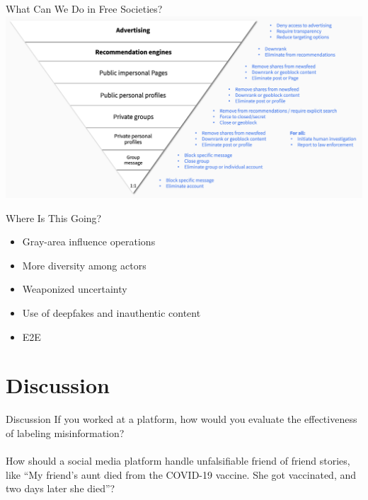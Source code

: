\documentclass[nobackground,dvipsnames,table,aspectratio=169]{beamer}
\begin{document}
\begin{frame}{What Can We Do in Free Societies?}
    \includegraphics[width=\textwidth]{amplification-pyramid-policies}
\end{frame}

\begin{frame}{Where Is This Going?}
    \large
    \begin{itemize}
        \item Gray-area influence operations
        \item More diversity among actors
        \item Weaponized uncertainty
        \item Use of deepfakes and inauthentic content
        \item E2E
    \end{itemize}
\end{frame}

\section{Discussion}

\begin{frame}{Discussion}
    If you worked at a platform, how would you evaluate the effectiveness of labeling misinformation?\\~\\

    How should a social media platform handle unfalsifiable friend of friend stories, like “My friend’s aunt died from the COVID-19 vaccine. She got vaccinated, and two days later she died”?
\end{frame}
\end{document}
